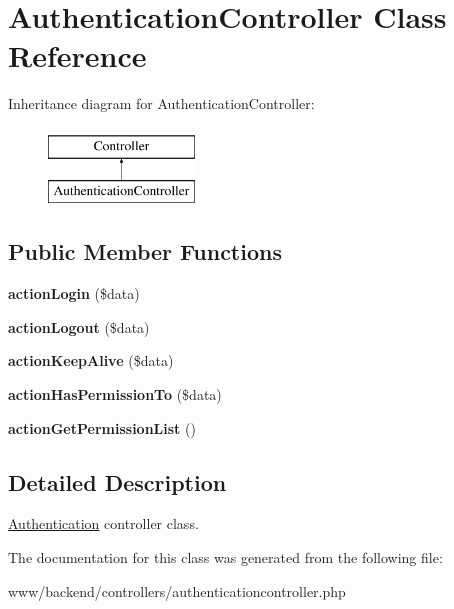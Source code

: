 \hypertarget{classAuthenticationController}{
\section{AuthenticationController Class Reference}
\label{classAuthenticationController}
}
Inheritance diagram for AuthenticationController:\begin{figure}[H]
\begin{center}
\leavevmode
\includegraphics[height=2.000000cm]{classAuthenticationController}
\end{center}
\end{figure}
\subsection*{Public Member Functions}
\begin{DoxyCompactItemize}
\item 
\hypertarget{classAuthenticationController_a508a7e66f7024926a2a9d3d24adb3eba}{
{\bfseries actionLogin} (\$data)}
\label{classAuthenticationController_a508a7e66f7024926a2a9d3d24adb3eba}

\item 
\hypertarget{classAuthenticationController_acdc76a1b78a881df16ae6beac5ca6ae3}{
{\bfseries actionLogout} (\$data)}
\label{classAuthenticationController_acdc76a1b78a881df16ae6beac5ca6ae3}

\item 
\hypertarget{classAuthenticationController_a68500ed26f6a8178e3e255f380ec8455}{
{\bfseries actionKeepAlive} (\$data)}
\label{classAuthenticationController_a68500ed26f6a8178e3e255f380ec8455}

\item 
\hypertarget{classAuthenticationController_a157fcb263bbb409a114ac940c2abfed0}{
{\bfseries actionHasPermissionTo} (\$data)}
\label{classAuthenticationController_a157fcb263bbb409a114ac940c2abfed0}

\item 
\hypertarget{classAuthenticationController_ac45eccdb761b3718d8d4789582b6aea6}{
{\bfseries actionGetPermissionList} ()}
\label{classAuthenticationController_ac45eccdb761b3718d8d4789582b6aea6}

\end{DoxyCompactItemize}


\subsection{Detailed Description}
\hyperlink{classAuthentication}{Authentication} controller class. 

The documentation for this class was generated from the following file:\begin{DoxyCompactItemize}
\item 
www/backend/controllers/authenticationcontroller.php\end{DoxyCompactItemize}
